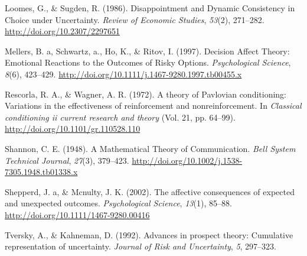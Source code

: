 \documentclass[10pt, letterpaper]{article}
\begin{document}
\hypertarget{ref-Loomes1986}{}
Loomes, G., \& Sugden, R. (1986). Disappointment and Dynamic Consistency
in Choice under Uncertainty. \emph{Review of Economic Studies},
\emph{53}(2), 271--282. \url{http://doi.org/10.2307/2297651}

\hypertarget{ref-Mellers1997}{}
Mellers, B. a, Schwartz, a., Ho, K., \& Ritov, I. (1997). Decision
Affect Theory: Emotional Reactions to the Outcomes of Risky Options.
\emph{Psychological Science}, \emph{8}(6), 423--429.
\url{http://doi.org/10.1111/j.1467-9280.1997.tb00455.x}

\hypertarget{ref-Rescorla1972}{}
Rescorla, R. A., \& Wagner, A. R. (1972). A theory of Pavlovian
conditioning: Variations in the effectiveness of reinforcement and
nonreinforcement. In \emph{Classical conditioning ii current research
and theory} (Vol. 21, pp. 64--99).
\url{http://doi.org/10.1101/gr.110528.110}

\hypertarget{ref-Shannon1948}{}
Shannon, C. E. (1948). A Mathematical Theory of Communication.
\emph{Bell System Technical Journal}, \emph{27}(3), 379--423.
\url{http://doi.org/10.1002/j.1538-7305.1948.tb01338.x}

\hypertarget{ref-Shepperd2002}{}
Shepperd, J. a, \& Mcnulty, J. K. (2002). The affective consequences of
expected and unexpected outcomes. \emph{Psychological Science},
\emph{13}(1), 85--88. \url{http://doi.org/10.1111/1467-9280.00416}

\hypertarget{ref-Tversky1992}{}
Tversky, A., \& Kahneman, D. (1992). Advances in prospect theory:
Cumulative representation of uncertainty. \emph{Journal of Risk and
Uncertainty}, \emph{5}, 297--323.
\end{document}
